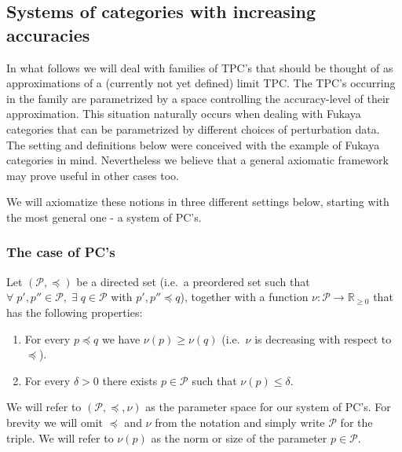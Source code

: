 
\subsection{Systems of categories with increasing
  accuracies} \label{s:sys-tpc}

In what follows we will deal with families of TPC's that should be
thought of as approximations of a (currently not yet defined) limit TPC. The
TPC's occurring in the family are parametrized by a space controlling
the accuracy-level of their approximation. This situation naturally
occurs when dealing with Fukaya categories that can be parametrized by
different choices of perturbation data. The setting and definitions
below were conceived with the example of Fukaya categories in
mind. Nevertheless we believe that a general axiomatic framework may
prove useful in other cases too.

We will axiomatize these notions in three different settings below,
starting with the most general one - a system of PC's.

\subsubsection{The case of PC's} \label{sb:sys-pc}
Let $(\mathcal{P}, \preceq)$ be a directed set (i.e.~a preordered set
such that
$\forall \; p', p'' \in \mathcal{P}, \; \exists \; q \in \mathcal{P}$
with $p', p'' \preceq q$), together with a function
$\nu: \mathcal{P} \longrightarrow \mathbb{R}_{\geq 0}$ that has the
following properties:
\begin{enumerate}
\item For every $p \preceq q$ we have $\nu(p) \geq \nu(q)$ (i.e.~$\nu$
  is decreasing with respect to $\preceq$).
\item For every $\delta>0$ there exists $p \in \mathcal{P}$ such that
  $\nu(p) \leq \delta$.
\end{enumerate}

We will refer to $(\mathcal{P}, \preceq , \nu)$ as the parameter space
for our system of PC's. For brevity we will omit $\preceq$ and $\nu$
from the notation and simply write $\mathcal{P}$ for the triple. We
will refer to $\nu(p)$ as the norm or size of the parameter
$p \in \mathcal{P}$.

